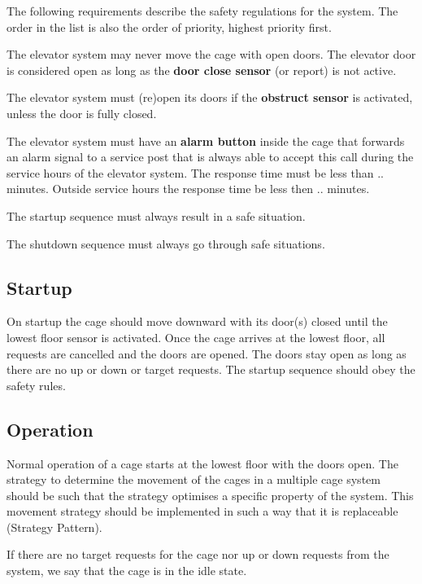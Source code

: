 The following requirements describe the safety regulations for the
system.
The order in the list is also the order of priority, highest priority first.
\begin{Enumerate}
\item The elevator system may never move the cage with open doors. The
  elevator door is considered open as long as the \textbf{door close 
  sensor} (or report) is not active.
\item The elevator system must (re)open its doors if the \textbf{obstruct
  sensor} is activated, unless the door is fully closed.
\item The elevator system must have an \textbf{alarm button} inside
  the cage that forwards an
  alarm signal to a service post that is always able to accept this
  call during the service hours of the elevator system. The response
  time must be less than .. minutes. Outside service hours the
  response time be less then  .. minutes.
\item The startup sequence must always result in a safe situation.
\item The shutdown sequence must always go through safe situations.

\end{Enumerate}

\subsection{Startup}
On startup the cage should move downward with its door(s) closed until
the lowest floor sensor is activated. Once the cage arrives at the
lowest floor, all requests are cancelled and the doors are opened. The
doors stay open as long as there are no up or down or target
requests. The startup sequence should obey the safety rules.


\subsection{Operation}
Normal operation of a cage starts at the lowest floor with the doors
open. The strategy to determine the movement  of the cages in a
multiple cage system should be such that the strategy optimises a
specific property of the system. This movement strategy should be
implemented in such a way that it is replaceable (Strategy Pattern). 

If there are no target requests for the cage nor up or down requests
from the system, we say that the cage is in the idle state.


